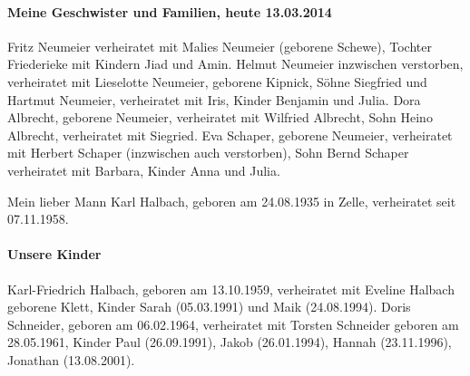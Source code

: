\documentclass[12pt, twoside]{book}
\begin{document}
\paragraph{Meine Geschwister und Familien, heute 13.03.2014} Fritz Neumeier verheiratet mit Malies Neumeier (geborene Schewe), Tochter Friederieke mit Kindern Jiad und Amin.
Helmut Neumeier inzwischen verstorben, verheiratet mit Lieselotte Neumeier, geborene Kipnick, Söhne Siegfried und Hartmut Neumeier, verheiratet mit Iris, Kinder Benjamin und Julia.
Dora Albrecht, geborene Neumeier, verheiratet mit Wilfried Albrecht, Sohn Heino Albrecht, verheiratet mit Siegried.
Eva Schaper, geborene Neumeier, verheiratet mit Herbert Schaper (inzwischen auch verstorben), Sohn Bernd Schaper verheiratet mit Barbara, Kinder Anna und Julia.

Mein lieber Mann Karl Halbach, geboren am 24.08.1935 in Zelle, verheiratet seit 07.11.1958.

\paragraph{Unsere Kinder} Karl-Friedrich Halbach, geboren am 13.10.1959, verheiratet mit Eveline Halbach geborene Klett, Kinder Sarah (05.03.1991) und Maik (24.08.1994).
Doris Schneider, geboren am 06.02.1964, verheiratet mit Torsten Schneider geboren am 28.05.1961, Kinder Paul (26.09.1991), Jakob (26.01.1994), Hannah (23.11.1996), Jonathan (13.08.2001).  
\end{document}

